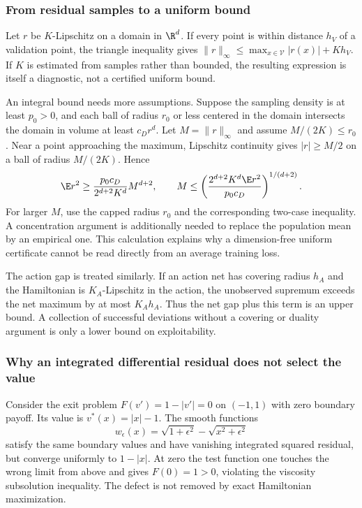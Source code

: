 \subsubsection{From residual samples to a uniform bound}
Let $r$ be $K$-Lipschitz on a domain in $\R^d$. If every point is within distance $h_V$ of a validation point, the triangle inequality gives $\|r\|_\infty\leq\max_{x\in\mathcal V}|r(x)|+Kh_V$. If $K$ is estimated from samples rather than bounded, the resulting expression is itself a diagnostic, not a certified uniform bound.

An integral bound needs more assumptions. Suppose the sampling density is at least $p_0>0$, and each ball of radius $r_0$ or less centered in the domain intersects the domain in volume at least $c_Dr^d$. Let $M=\|r\|_\infty$ and assume $M/(2K)\leq r_0$. Near a point approaching the maximum, Lipschitz continuity gives $|r|\geq M/2$ on a ball of radius $M/(2K)$. Hence
\[
 \E r^2\geq\frac{p_0c_D}{2^{d+2}K^d}M^{d+2},\qquad
 M\leq\left(\frac{2^{d+2}K^d\E r^2}{p_0c_D}\right)^{1/(d+2)}.
\]
For larger $M$, use the capped radius $r_0$ and the corresponding two-case inequality. A concentration argument is additionally needed to replace the population mean by an empirical one. This calculation explains why a dimension-free uniform certificate cannot be read directly from an average training loss.

The action gap is treated similarly. If an action net has covering radius $h_A$ and the Hamiltonian is $K_A$-Lipschitz in the action, the unobserved supremum exceeds the net maximum by at most $K_Ah_A$. Thus the net gap plus this term is an upper bound. A collection of successful deviations without a covering or duality argument is only a lower bound on exploitability.

\subsubsection{Why an integrated differential residual does not select the value}
Consider the exit problem $F(v')=1-|v'|=0$ on $(-1,1)$ with zero boundary payoff. Its value is $v^*(x)=|x|-1$. The smooth functions
\[
 w_\epsilon(x)=\sqrt{1+\epsilon^2}-\sqrt{x^2+\epsilon^2}
\]
satisfy the same boundary values and have vanishing integrated squared residual, but converge uniformly to $1-|x|$. At zero the test function one touches the wrong limit from above and gives $F(0)=1>0$, violating the viscosity subsolution inequality. The defect is not removed by exact Hamiltonian maximization.

